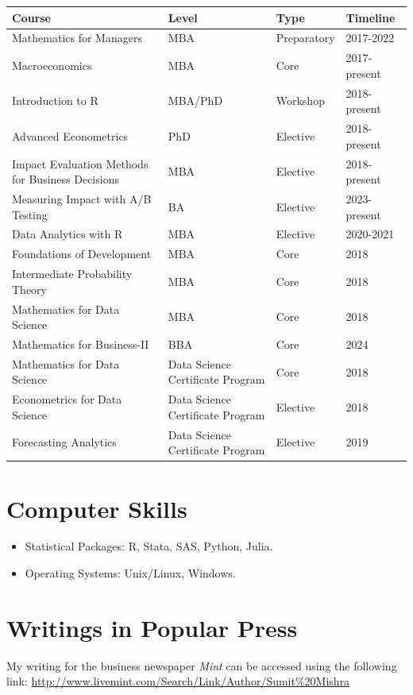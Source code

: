 \documentclass[10pt]{article}
\begin{document}
\begin{tabular}[t]{llll}
\toprule
\textbf{Course} & \textbf{Level} & \textbf{Type} & \textbf{Timeline}\\
\midrule
Mathematics for Managers & MBA & Preparatory & 2017-2022\\
Macroeconomics & MBA & Core & 2017- present\\
Introduction to R & MBA/PhD & Workshop & 2018- present\\
Advanced Econometrics & PhD & Elective & 2018- present\\
Impact Evaluation Methods for Business Decisions & MBA & Elective & 2018- present\\
\addlinespace
Measuring Impact with A/B Testing & BA & Elective & 2023-present \\
Data Analytics with R & MBA & Elective & 2020-2021\\
Foundations of Development & MBA & Core & 2018\\
Intermediate Probability Theory & MBA & Core & 2018\\
Mathematics for Data Science & MBA & Core & 2018\\
Mathematics for Business-II & BBA & Core & 2024 \\
\addlinespace
Mathematics for Data Science & Data Science Certificate Program & Core & 2018\\
Econometrics for Data Science & Data Science Certificate Program & Elective & 2018\\
Forecasting Analytics & Data Science Certificate Program & Elective & 2019\\
\bottomrule
\end{tabular}

\section{\sc Computer Skills} 
\begin{itemize}
\item Statistical Packages:  R, Stata, SAS, Python, Julia.
\item Operating Systems:  Unix/Linux, Windows.
\end{itemize}

\section{\sc Writings in Popular Press}

My writing for the business newspaper \textit{Mint} can be accessed
using the following link:
\url{http://www.livemint.com/Search/Link/Author/Sumit\%20Mishra}
\end{document}
